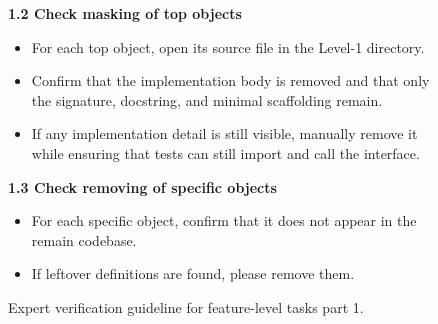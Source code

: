 \documentclass{article}
\begin{document}
\begin{figure}[t]
\begin{tcolorbox}
\textbf{1.2 Check masking of top objects}
\begin{itemize}
    \item For each top object, open its source file in the Level-1 directory.
    \item Confirm that the implementation body is removed and that only the signature,
    docstring, and minimal scaffolding remain.
    \item If any implementation detail is still visible, manually remove it while ensuring
    that tests can still import and call the interface.
\end{itemize}

\textbf{1.3 Check removing of specific objects}
\begin{itemize}
    \item For each specific object, confirm that it does not appear in the remain codebase.
    \item If leftover definitions are found, please remove them.
\end{itemize}

\end{tcolorbox}
\caption{Expert verification guideline for feature-level tasks part 1.}
\label{fig:feature_verification_guideline_part1}
\end{figure}
\end{document}
